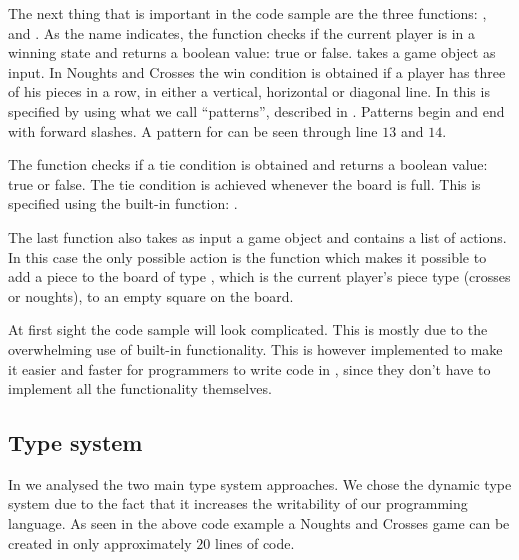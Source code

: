 
The next thing that is important in the code sample are the three functions: 
,  and . 
As the name indicates, the function  checks if the current player
is in a winning state and returns a boolean value: true or false.
 takes a game object as input. In Noughts and Crosses the
win condition is obtained if a player has three of his pieces in a row, in
either a vertical, horizontal or diagonal line. In \productname{} this is
specified by using what we call ``patterns'', described in
. Patterns begin and end with forward slashes. A pattern for
 can be seen through line $13$ and $14$.

The  function checks if a tie condition is obtained and
returns a boolean value: true or false. The tie condition is achieved whenever
the board is full. This is specified using the built-in function:
. 

The last function  also takes as input a game object and
contains a list of actions. In this case the only possible action is the
 function which makes it possible to add a piece to the
board of type , which is the current player's piece type (crosses
or noughts), to an empty square on the board.

At first sight the code sample will look complicated. This is mostly due to the
overwhelming use of built-in functionality. This is however implemented to make
it easier and faster for programmers to write code in \productname{}, since they
don't have to implement all the functionality themselves.

\subsection*{Type system}

In  we analysed the two main type system
approaches.  We chose the dynamic type system due to the fact that it increases
the writability of our programming language. As seen in the above code example
 a Noughts and Crosses game can be created in only
approximately $20$ lines of code.

